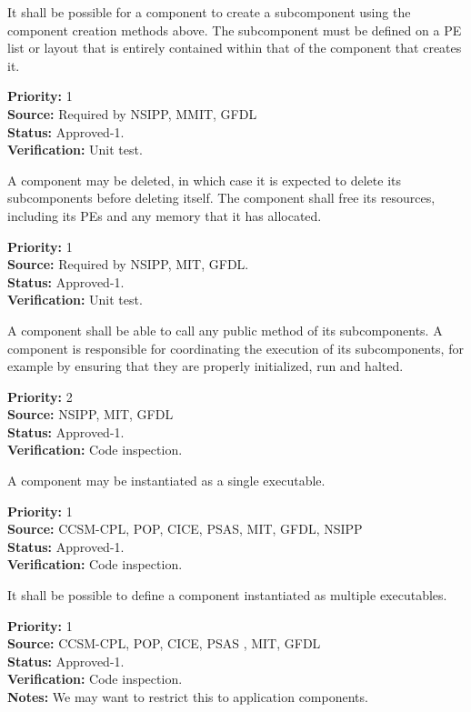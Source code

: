 It shall be possible for a component to create a subcomponent 
using the component creation methods above.  The subcomponent 
must be defined on a PE list or layout that is entirely contained 
within that of the component that creates it.
\begin{reqlist}
{\bf Priority:} 1 \\
{\bf Source:} Required by NSIPP, MMIT, GFDL\\
{\bf Status:} Approved-1.\\
{\bf Verification:} Unit test.
\end{reqlist}

A component may be deleted, in which case it is expected to delete
its subcomponents before deleting itself.  The component shall free
its resources, including its PEs and any memory that it has allocated. 
\begin{reqlist}
{\bf Priority:} 1 \\
{\bf Source:} Required by NSIPP, MIT, GFDL.\\
{\bf Status:} Approved-1.\\
{\bf Verification:} Unit test.
\end{reqlist}

A component shall be able to call any public method of its 
subcomponents.  A component is responsible for coordinating
the execution of its subcomponents, for example by ensuring
that they are properly initialized, run and halted.
\begin{reqlist}
{\bf Priority:} 2 \\
{\bf Source:} NSIPP, MIT, GFDL \\
{\bf Status:} Approved-1.\\
{\bf Verification:} Code inspection. \\
\end{reqlist}

A component may be instantiated as a single executable.
\begin{reqlist}
{\bf Priority:} 1 \\
{\bf Source:} CCSM-CPL, POP, CICE, PSAS, MIT, GFDL, NSIPP \\
{\bf Status:} Approved-1.\\
{\bf Verification:} Code inspection. \\
\end{reqlist}

It shall be possible to define a component instantiated as
multiple executables.
\begin{reqlist}
{\bf Priority:} 1 \\
{\bf Source:} CCSM-CPL, POP, CICE, PSAS , MIT, GFDL \\
{\bf Status:} Approved-1.\\
{\bf Verification:} Code inspection. \\
{\bf Notes:} We may want to restrict this to application components.
\end{reqlist}

